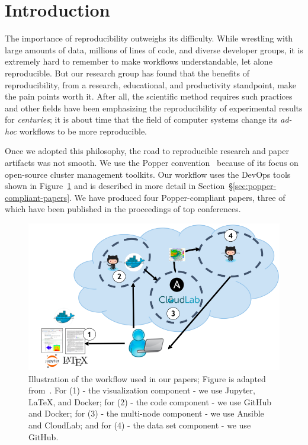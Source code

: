 \section{Introduction}

The importance of reproducibility outweighs its difficulty. While wrestling
with large amounts of data, millions of lines of code, and diverse developer
groups, it is extremely  hard to remember to make workflows understandable, let
alone reproducible. But our research group has found  that the benefits of
reproducibility, from a research, educational, and productivity standpoint,
make the pain points worth it. After all, the scientific method requires such
practices  and other fields have been emphasizing the reproducibility of
experimental results for {\it centuries}; it is about time that the field of
computer systems change its {\it ad-hoc} workflows to be more reproducible.

Once we adopted this philosophy, the road to reproducible research and paper
artifacts was not smooth.  We use the Popper
convention~\cite{jimenez:ipdpsw17-popper} because of its focus on open-source
cluster management toolkits. Our workflow uses the DevOps tools shown in
Figure~\ref{fig:workflow} and is described in more detail in
Section~\S\ref{sec:popper-compliant-papers}. We have produced four
Popper-compliant papers, three of which have been published in the proceedings
of top conferences.

\begin{figure}[tb] 
  \centering
  \includegraphics[width=1\linewidth]{./figures/workflow.png}
  \caption{Illustration of the workflow used in our papers; Figure is
adapted from~\cite{jimenez:ipdpsw17-popper}. For (1) - the visualization
component - we use Jupyter, \LaTeX, and Docker; for (2) - the code component -
we use GitHub and Docker; for (3) - the multi-node component - we use Ansible
and CloudLab; and for (4) - the data set component - we use GitHub.}
  \label{fig:workflow}
\end{figure}


